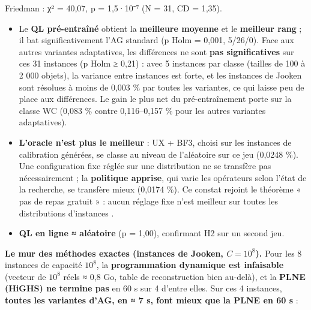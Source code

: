 \documentclass[
  french,
  11pt,
  a4paper,
]{article}
\providecommand{\tightlist}{%
  \setlength{\itemsep}{0pt}\setlength{\parskip}{0pt}}
\begin{document}
Friedman : χ² = 40,07, p = 1,5·10⁻⁷ (N = 31, CD = 1,35).

\begin{itemize}
\tightlist
\item
  Le \textbf{QL pré-entraîné} obtient la \textbf{meilleure moyenne} et
  le \textbf{meilleur rang} ; il bat significativement l'AG standard (p
  Holm = 0,001, 5/26/0). Face aux autres variantes adaptatives, les
  différences ne sont \textbf{pas significatives} sur ces 31 instances
  (p Holm ≥ 0,21) : avec 5 instances par classe (tailles de 100 à 2 000
  objets), la variance entre instances est forte, et les instances de
  Jooken sont résolues à moins de 0,003 \% par toutes les variantes, ce
  qui laisse peu de place aux différences. Le gain le plus net du
  pré-entraînement porte sur la classe WC (0,083 \% contre 0,116--0,157
  \% pour les autres variantes adaptatives).
\item
  \textbf{L'oracle n'est plus le meilleur} : UX + BF3, choisi sur les
  instances de calibration générées, se classe au niveau de l'aléatoire
  sur ce jeu (0,0248 \%). Une configuration fixe réglée sur une
  distribution ne se transfère pas nécessairement ; la \textbf{politique
  apprise}, qui varie les opérateurs selon l'état de la recherche, se
  transfère mieux (0,0174 \%). Ce constat rejoint le théorème « pas de
  repas gratuit » : aucun réglage fixe n'est meilleur sur toutes les
  distributions d'instances \autocite{wolpert_macready_1997}.
\item
  \textbf{QL en ligne ≈ aléatoire} (p = 1,00), confirmant H2 sur un
  second jeu.
\end{itemize}

\textbf{Le mur des méthodes exactes (instances de Jooken,
\(C = 10^8\)).} Pour les 8 instances de capacité \(10^8\), la
\textbf{programmation dynamique est infaisable} (vecteur de \(10^8\)
réels ≈ 0,8 Go, table de reconstruction bien au-delà), et la
\textbf{PLNE (HiGHS) ne termine pas} en 60 s sur 4 d'entre elles. Sur
ces 4 instances, \textbf{toutes les variantes d'AG, en ≈ 7 s, font mieux
que la PLNE en 60 s} :
\end{document}

